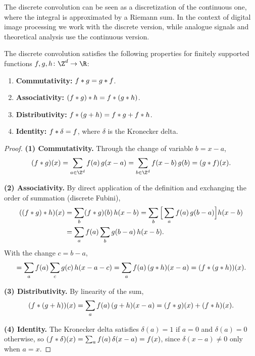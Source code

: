 The discrete convolution can be seen as a discretization of the continuous one,
where the integral is approximated by a Riemann sum. In the context of digital
image processing we work with the discrete version, while analogue signals and
theoretical analysis use the continuous version.

\begin{proposition}
\label{prop:grids:algebra}
The discrete convolution satisfies the following properties for finitely
supported functions $f, g, h \colon \Z^d \to \R$:
\begin{enumerate}
  \item \textbf{Commutativity:} $f * g = g * f$.
  \item \textbf{Associativity:} $(f * g) * h = f * (g * h)$.
  \item \textbf{Distributivity:} $f * (g + h) = f * g + f * h$.
  \item \textbf{Identity:} $f * \delta = f$, where $\delta$ is the Kronecker
    delta.
\end{enumerate}
\end{proposition}

\begin{proof}
\textbf{(1) Commutativity.} Through the change of variable $b = x - a$,
\[
  (f \conv g)(x) = \sum_{a \in \Z^d} f(a)\,g(x - a)
   = \sum_{b \in \Z^d} f(x - b)\,g(b) = (g \conv f)(x).
\]

\textbf{(2) Associativity.} By direct application of the definition and
exchanging the order of summation (discrete Fubini),
\begin{align}
((f * g) * h)(x)
  &= \sum_{b} (f * g)(b)\,h(x - b)
   = \sum_{b} \Big[\sum_{a} f(a)\,g(b - a)\Big] h(x - b) \nonumber \\
  &= \sum_{a} f(a) \sum_{b} g(b - a)\,h(x - b).
\end{align}
With the change $c = b - a$,
\[
  = \sum_{a} f(a) \sum_{c} g(c)\,h(x - a - c)
   = \sum_{a} f(a)\,(g * h)(x - a) = (f * (g * h))(x).
\]

\textbf{(3) Distributivity.} By linearity of the sum,
\[
  (f * (g + h))(x) = \sum_{a} f(a)\,(g + h)(x - a)
   = (f * g)(x) + (f * h)(x).
\]

\textbf{(4) Identity.} The Kronecker delta satisfies $\delta(a) = 1$ if $a = 0$
and $\delta(a) = 0$ otherwise, so $(f * \delta)(x) = \sum_a f(a)\,\delta(x-a)
= f(x)$, since $\delta(x - a) \neq 0$ only when $a = x$.
\end{proof}

